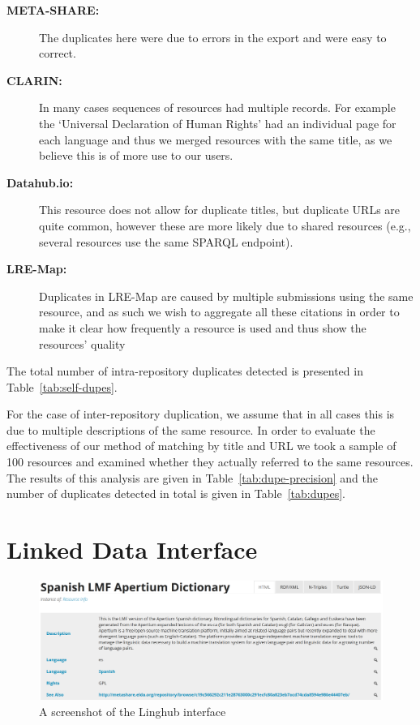 \documentclass[smallextended]{svjour3}       %
\begin{document}
\begin{description}
    \item[\textbf{META-SHARE:}] The duplicates here were due to errors in the export and
        were easy to correct.
    \item[\textbf{CLARIN:}] In many cases sequences of resources had multiple records. For
        example the `Universal Declaration of Human Rights' had an individual
        page for each language and thus we merged resources with the same title,
        as we believe this is of more use to our users.
    \item[\textbf{Datahub.io:}] This resource does not allow for duplicate titles, but
        duplicate URLs are quite common, however these are more likely due to
        shared resources (e.g., several resources use the same SPARQL endpoint).
    \item[\textbf{LRE-Map:}] Duplicates in LRE-Map are caused by multiple submissions
        using the same resource, and as such we wish to aggregate all these
        citations in order to make it clear how frequently a resource is used
        and thus show the resources' quality
\end{description}

The total number of intra-repository duplicates detected is presented in Table~\ref{tab:self-dupes}.

For the case of inter-repository duplication, we assume that in all cases this
is due to multiple descriptions of the same resource. In order to evaluate the
effectiveness of our method of matching by title and URL we took a sample of 100
resources and examined whether they actually referred to the same resources. The
results of this analysis are given in Table~\ref{tab:dupe-precision} and the number of duplicates detected in total is given in Table~\ref{tab:dupes}.


\section{Linked Data Interface}
\label{linked-data-interface}


\begin{figure}
\includegraphics[width=\textwidth]{img/linghub-screenshot.png}
\caption{A screenshot of the Linghub interface\label{fig:screenshot}}
\end{figure}
\end{document}

